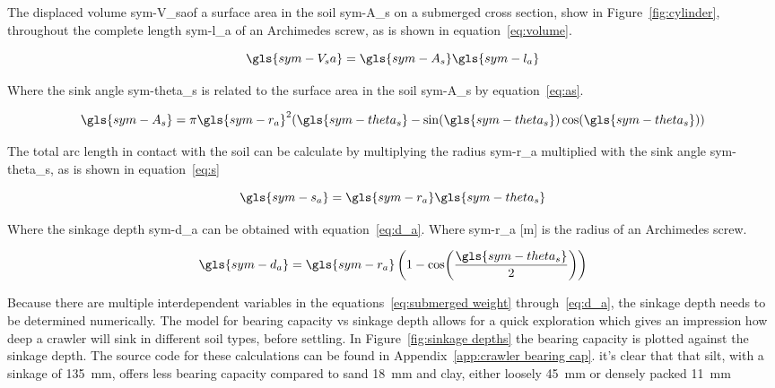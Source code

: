 \noindent The displaced volume \gls{sym-V_sa}of a surface area in the soil \gls{sym-A_s} on a submerged cross section,
show in Figure~\ref{fig:cylinder}, throughout the complete length \gls{sym-l_a} of an Archimedes screw, as is shown in
equation~\ref{eq:volume}.

\begin{equation}
    \label{eq:volume}
    \gls{sym-V_sa} = \gls{sym-A_s} \gls{sym-l_a}
\end{equation}

\noindent Where the sink angle \gls{sym-theta_s} is related to the surface area in the soil \gls{sym-A_s} by
equation~\ref{eq:as}.

\begin{equation}
    \label{eq:as}
    \gls{sym-A_s} = \pi \gls{sym-r_a}^2(\gls{sym-theta_s} - \sin(\gls{sym-theta_s})\cos(\gls{sym-theta_s}))
\end{equation}

\noindent The total arc length in contact with the soil can be calculate by multiplying the radius \gls{sym-r_a}
multiplied with the sink angle \gls{sym-theta_s}, as is shown in equation~\ref{eq:s}

\begin{equation}
    \label{eq:s}
    \gls{sym-s_a} = \gls{sym-r_a} \gls{sym-theta_s}
\end{equation}

\noindent Where the sinkage depth \gls{sym-d_a} can be obtained with equation~\ref{eq:d_a}. Where \gls{sym-r_a} [m]
is the radius of an Archimedes screw.

\begin{equation}
    \label{eq:d_a}
    \gls{sym-d_a} = \gls{sym-r_a}\left(1-\cos(\frac{\gls{sym-theta_s}}{2})\right)
\end{equation}

Because there are multiple interdependent variables in the equations~\ref{eq:submerged weight} through~\ref{eq:d_a}, the
sinkage depth needs to be determined numerically. The model for bearing capacity vs sinkage depth allows for a quick
exploration which gives an impression how deep a crawler will sink in different soil types, before settling. In
Figure~\ref{fig:sinkage depths} the bearing capacity is plotted against the sinkage depth. The source code for these
calculations can be found in Appendix~\ref{app:crawler bearing cap}. it's clear that that silt, with a sinkage of
\SI{135}{\milli\meter}, offers less bearing capacity compared to sand \SI{18}{\milli\meter} and clay, either loosely
\SI{45}{\milli\meter} or densely packed \SI{11}{\milli\meter}

